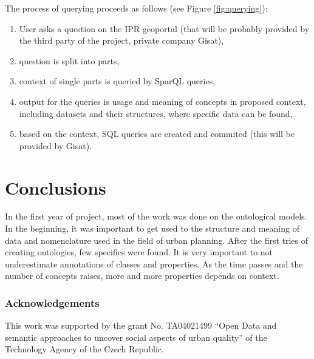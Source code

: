\documentclass{lncs-template/llncs}
\begin{document}
The process of querying proceeds as follows (see Figure \ref{fig:querying}):
\begin{enumerate}
\item User asks a question on the IPR geoportal (that will be probably provided by the third party of the project, private company Gisat), 
\item question is split into parts,
\item context of single parts is queried by SparQL queries,
\item output for the queries is usage and meaning of concepts in proposed context, including datasets and their structures, where specific data can be found,
\item based on the context, SQL queries are created and commited (this will be provided by Gisat).
\end{enumerate}

\section{Conclusions}

In the first year of project, most of the work was done on the ontological models. In the beginning, it was important to get used to the structure and meaning of data and nomenclature used in the field of urban planning. After the first tries of creating ontologies, few specifics were found. It is very important to not underestimate annotations of classes and properties. As the time passes and the number of concepts raises, more and more properties depends on context. 

\subsubsection*{Acknowledgements}\label{sec:ack}
\noindent This work was supported by the grant No. TA04021499 ``Open Data and semantic approaches to uncover social aspects of urban quality'' of the Technology Agency of the Czech Republic.



\end{document}
